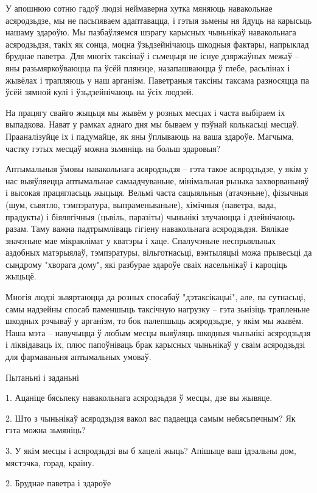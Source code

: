 У апошнюю сотню гадоў людзі неймаверна хутка мяняюць навакольнае асяродзьдзе, мы не пасьпяваем адаптавацца, і гэтыя зьмены ня йдуць на карысьць нашаму здароўю. Мы пазбаўляемся шэрагу карысных чыньнікаў навакольнага асяродзьдзя, такіх як сонца, моцна ўзьдзейнічаюць шкодныя фактары, напрыклад бруднае паветра. Для многіх таксінаў і сьмецьця не існуе дзяржаўных межаў – яны разьмяркоўваюцца па ўсёй плянэце, назапашваюцца ў глебе, расьлінах і жывёлах і трапляюць у наш арганізм. Паветраныя таксіны таксама разносяцца па ўсёй зямной кулі і ўзьдзейнічаюць на ўсіх людзей.

На працягу свайго жыцьця мы жывём у розных месцах і часта выбіраем іх выпадкова. Нават у рамках аднаго дня мы бываем у пэўнай колькасьці месцаў. Прааналізуйце іх і падумайце, як яны ўплываюць на ваша здароўе. Магчыма, частку гэтых месцаў можна зьмяніць на больш здаровыя?

Аптымальныя ўмовы навакольнага асяродзьдзя – гэта такое асяродзьдзе, у якім у нас выяўляецца аптымальнае самаадчуваньне, мінімальная рызыка захворваньняў і высокая працягласьць жыцьця. Вельмі часта сацыяльныя (атачэньне), фізычныя (шум, сьвятло, тэмпэратура, выпраменьваньне), хімічныя (паветра, вада, прадукты) і біялягічныя (цьвіль, паразіты) чыньнікі злучаюцца і дзейнічаюць разам. Таму важна падтрымліваць гігіену навакольнага асяродзьдзя. Вялікае значэньне мае мікраклімат у кватэры і хаце. Спалучэньне неспрыяльных аздобных матэрыялаў, тэмпэратуры, вільготнасьці, вэнтыляцыі можа прывесьці да сындрому "хворага дому", які разбурае здароўе сваіх насельнікаў і кароціць жыцьцё.

Многія людзі зьвяртаюцца да розных спосабаў "дэтаксікацыі", але, па сутнасьці, самы надзейны спосаб паменшыць таксічную нагрузку – гэта зьнізіць трапленьне шкодных рэчываў у арганізм, то бок палепшыць асяродзьдзе, у якім мы жывём. Наша мэта – навучыцца ў любым месцы выяўляць шкодныя чыньнікі асяродзьдзя і ліквідаваць іх, плюс папоўніваць брак карысных чыньнікаў у сваім асяродзьдзі для фармаваньня аптымальных умоваў.

Пытаньні і заданьні

1. Ацаніце бясьпеку навакольнага асяродзьдзя ў месцы, дзе вы жывяце.

2. Што з чыньнікаў асяродзьдзя вакол вас падаецца самым небясьпечным? Як гэта можна зьмяніць?

3. У якім месцы і асяродзьдзі вы б хацелі жыць? Апішыце ваш ідэальны дом, мястэчка, горад, краіну.


2. Бруднае паветра і здароўе

